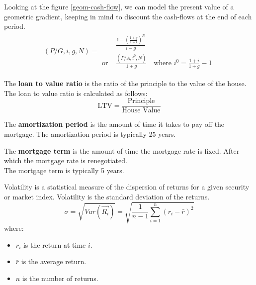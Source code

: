 \begin{definition}
    Looking at the figure \ref{geom-cash-flow}, we can model the present value of a geometric gradient, keeping in mind to discount the cash-flows at the end of each period.
    \begin{align*}
        \boxed{(P/G, i, g, N) =\begin{aligned}
                                                  & \frac{1 - (\frac{1 + g}{1 + i})^N}{i - g}                                     \\
                                       \text{or } & \frac{(P/A, i^0, N)}{1 + g} \quad \text{where } i^0 = \frac{1 + i}{1 + g} - 1
                                   \end{aligned}}
    \end{align*}
\end{definition}

\begin{definition}
    The \textbf{loan to value ratio} is the ratio of the principle to the value of the house. The loan to value ratio is calculated as follows:
    \[
        \text{LTV} = \frac{\text{Principle}}{\text{House Value}}
    \]
\end{definition}


\begin{definition}
    The \textbf{amortization period} is the amount of time it takes to pay off the mortgage. The amortization period is typically 25 years.
\end{definition}


\begin{definition}
    The \textbf{mortgage term} is the amount of time the mortgage rate is fixed. After which the mortgage rate is renegotiated.
    \\ The mortgage term is typically 5 years.
\end{definition}
\begin{definition}
    [Volatility]
    Volatility is a statistical measure of the dispersion of returns for a given security or market index.
    Volatility is the standard deviation of the returns.
    \begin{equation}
        \sigma = \sqrt{Var(\overrightarrow{R_i})} = \sqrt{\frac{1}{n-1} \sum_{i=1}^{n} (r_i - \bar{r})^2}
    \end{equation}
    where:
    \begin{itemize}
        \item $r_i$ is the return at time $i$.
        \item $\bar{r}$ is the average return.
        \item $n$ is the number of returns.
    \end{itemize}
\end{definition}

